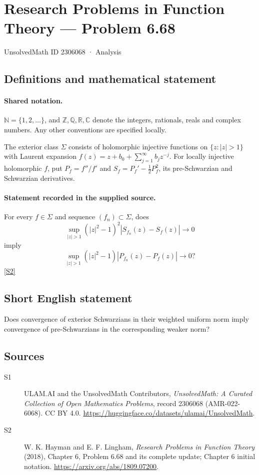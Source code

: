 \documentclass[11pt]{article}
\newcommand{\sref}[2]{\hyperlink{source:#1:#2}{[S#2]}}
\begin{document}
\setcounter{section}{2306067}
\section{Research Problems in Function Theory — Problem 6.68}\label{2306068}
{\small\sffamily UnsolvedMath ID 2306068 · Analysis}
\subsection{Definitions and mathematical statement}

\paragraph{Shared notation.}$\mathbb N=\{1,2,\ldots\}$, and $\mathbb Z,\mathbb Q,\mathbb R,\mathbb C$ denote the integers, rationals, reals and complex numbers. Any other conventions are specified locally.


The exterior class $\Sigma$ consists of holomorphic injective functions on $\{z:|z|>1\}$ with Laurent expansion $f(z)=z+b_0+\sum_{j=1}^{\infty}b_jz^{-j}$. For locally injective holomorphic $f$, put $P_f=f''/f'$ and $S_f=P_f'-\tfrac12P_f^2$, its pre-Schwarzian and Schwarzian derivatives.
\paragraph{Statement recorded in the supplied source.}
For every $f\in\Sigma$ and sequence $(f_n)\subset\Sigma$, does \[\sup_{|z|>1}(|z|^2-1)^2|S_{f_n}(z)-S_f(z)|\longrightarrow0\] imply \[\sup_{|z|>1}(|z|^2-1)|P_{f_n}(z)-P_f(z)|\longrightarrow0?\] \sref{2306068}{2}
\subsection{Short English statement}
Does convergence of exterior Schwarzians in their weighted uniform norm imply convergence of pre-Schwarzians in the corresponding weaker norm?
\subsection{Sources}
\begin{description}
\item[\hypertarget{source:2306068:1}{S1}] ULAM.AI and the UnsolvedMath Contributors, \emph{UnsolvedMath: A Curated Collection of Open Mathematics Problems}, record 2306068 (AMR-022-6068). CC BY 4.0. \url{https://huggingface.co/datasets/ulamai/UnsolvedMath}.
\item[\hypertarget{source:2306068:2}{S2}] W. K. Hayman and E. F. Lingham, \emph{Research Problems in Function Theory} (2018), Chapter 6, Problem 6.68 and its complete update; Chapter 6 initial notation. \url{https://arxiv.org/abs/1809.07200}.
\end{description}
\label{end:2306068}
\end{document}
